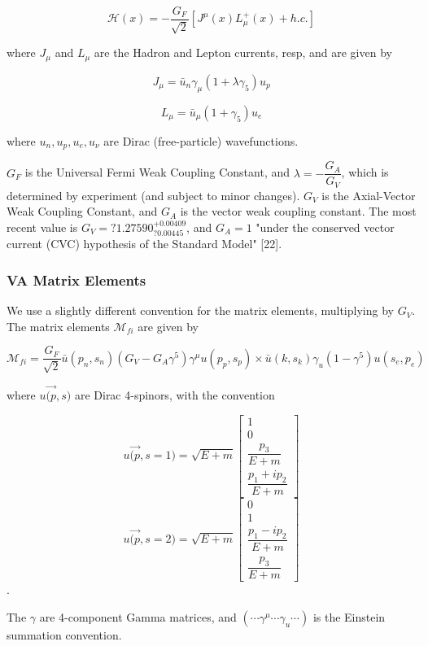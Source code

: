 \documentclass[11pt]{amsart}
\begin{document}
$$\mathcal{H}(x)=-\dfrac{G_{F}}{\sqrt{2}}\left[J^{\mu}(x)L^{+}_{\mu}(x)+h.c.\right]$$

where $J_{\mu}$ and $L_{\mu}$ are the Hadron and Lepton currents, resp, and are given by

$$J_{\mu}=\bar{u}_{n}\gamma_{\mu}(1+\lambda\gamma_{5})u_{p}$$

$$L_{\mu}=\bar{u}_{\mu}(1+\gamma_{5})u_{e}$$

where $u_{n},u_{p},u_{e},u_{\nu}$ are Dirac (free-particle) wavefunctions.

$G_{F}$ is the Universal Fermi Weak Coupling Constant, and $\lambda=-\dfrac{G_{A}}{G_{V}}$, which is determined by experiment (and subject to minor changes).  $G_{V}$ is the Axial-Vector Weak Coupling Constant, and $G_{A}$ is the vector weak coupling
constant.  The most recent value is $G_{V}=?1.27590^{+0.00409}_{?0.00445}$, and $G_{A}=1$ "under the conserved vector current (CVC) hypothesis of the Standard Model" [22].

\subsubsection{VA Matrix Elements}

We use a slightly different convention for the matrix elements, multiplying by $G_{V}$.  The matrix elements $\mathcal{M}_{fi}$ are given by

$$\mathcal{M}_{fi}=\dfrac{G_{F}}{\sqrt{2}}\bar{u}(p_{n},s_{n})(G_{V}-G_{A}\gamma^{5})\gamma^{\mu}u(p_{p},s_{p})\times\bar{u}(k,s_{k})\gamma_{u}(1-\gamma^{5})u(s_{e},p_{e})$$

where $u\overrightarrow{(p},s)$ are Dirac 4-spinors, with the convention

$$u\overrightarrow{(p},s=1)=\sqrt{E+m}\left[\begin{array}{c}
1\\
0\\
\dfrac{p_{3}}{E+m}\\
\dfrac{p_{1}+ip_{2}}{E+m}
\end{array}\right]$$
$$u\overrightarrow{(p},s=2)=\sqrt{E+m}\left[\begin{array}{c}
0\\
1\\
\dfrac{p_{1}-ip_{2}}{E+m}\\
\dfrac{p_{3}}{E+m}
\end{array}\right]$$.


The $\gamma$ are 4-component Gamma matrices, and  $(\cdots\gamma^{\mu}\cdots\gamma_{u}\cdots)$ is the Einstein summation convention.
\end{document}
